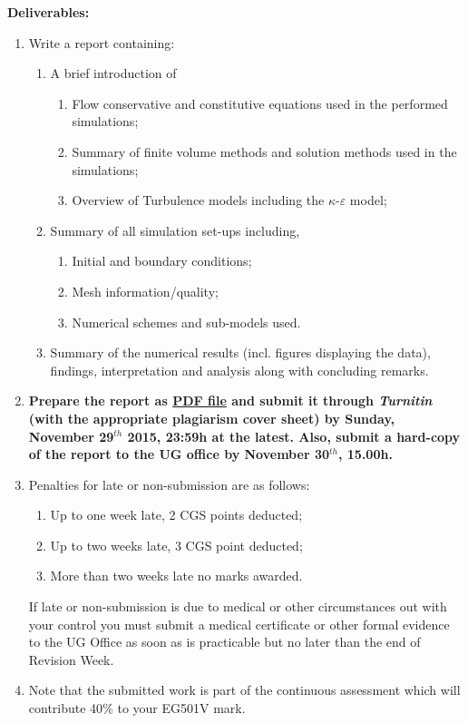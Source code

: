 \documentclass[12pts,a4paper,amsmath,amssymb,floatfix]{article}%
\renewcommand\epsilon{\varepsilon}
\begin{document}
{\bf Deliverables:}
\begin{enumerate}
  \item Write a report containing:
  \begin{enumerate} 
    \item A brief introduction of
       \begin{enumerate}%
          \item Flow conservative and constitutive equations used in the performed simulations;
          \item Summary of finite volume methods and solution methods used in the simulations;
          \item Overview of Turbulence models including the $\kappa$-$\epsilon$ model;    
       \end{enumerate}
    \item Summary of all simulation set-ups including,
       \begin{enumerate}%
          \item Initial and boundary conditions;
          \item Mesh information/quality;
          \item Numerical schemes and sub-models used.
       \end{enumerate}
    \item Summary of the numerical results (incl. figures displaying the data), findings, interpretation and analysis along with concluding remarks.
  \end{enumerate}
%
\item {\bf Prepare the report as \underline{PDF file} and submit it through {\it Turnitin} (with the appropriate plagiarism cover sheet) by Sunday, November 29$^{th}$ 2015, 23:59h at the latest. Also, submit a hard-copy of the report to the UG office by November 30$^{th}$, 15.00h.}
%
%
\item Penalties for late or non-submission are as follows:
\begin{enumerate}%
\item Up to one week late, 2 CGS points deducted;
\item Up to two weeks late, 3 CGS point deducted;
\item More than two weeks late no marks awarded.
\end{enumerate}
If late or non-submission is due to medical or other circumstances out with your control you must submit a medical certificate or other formal evidence to the UG Office as soon as is practicable but no later than the end of Revision Week.


\item Note that the submitted work is part of the continuous assessment which will contribute 40$\%$ to your EG501V mark.

\end{enumerate}



\clearpage

%
\end{document}
